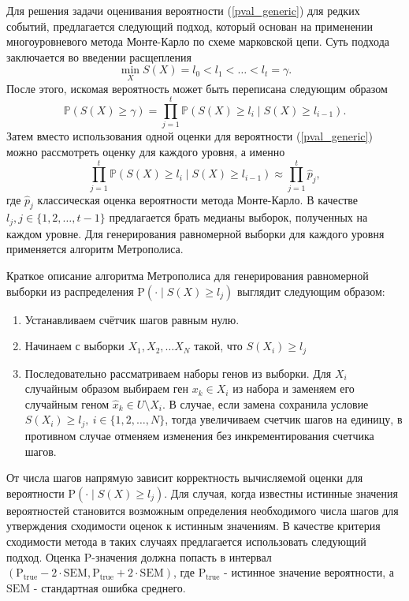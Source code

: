 Для решения задачи оценивания вероятности (\ref{pval_generic}) для редких событий, предлагается следующий подход, который основан на применении многоуровневого метода Монте-Карло по схеме марковской цепи.
Суть подхода заключается во введении расщепления 
\begin{equation*}
    \min_{X} S(X) = l_0 < l_1 < \ldots < l_t = \gamma.
\end{equation*}
После этого, искомая вероятность может быть переписана следующим образом
\begin{equation*}
    \mathbb{P} \left(S(X) \geqslant \gamma \right) = \prod\limits_{j=1}^{t} \mathbb{P} \left(S(X) \geqslant l_i \mid S(X) \geqslant l_{i - 1} \right).
\end{equation*}
Затем вместо использования одной оценки для вероятности (\ref{pval_generic}) можно рассмотреть оценку для каждого уровня, а именно
\begin{equation*}
    \prod\limits_{j=1}^{t} \mathbb{P} \left(S(X) \geqslant l_i \mid S(X) \geqslant l_{i - 1} \right) \approx \prod_{j = 1}^{t} \hat{p}_j,
\end{equation*}
где $\hat{p}_j$ классическая оценка вероятности метода Монте-Карло. 
В качестве $l_j, j \in \{1, 2, \ldots, t-1\}$ предлагается брать медианы выборок, полученных на каждом уровне.
Для генерирования равномерной выборки для каждого уровня применяется алгоритм Метрополиса.

Краткое описание алгоритма Метрополиса для генерирования равномерной выборки из распределения $\mathrm{P}\left(\cdot \mid S(X) \geqslant l_j \right)$ выглядит следующим образом:
\begin{enumerate}
    \item Устанавливаем счётчик шагов равным нулю.
    \item Начинаем с выборки $X_1, X_2, \ldots X_N$ такой, что $S(X_i) \geqslant l_j$
    \item Последовательно рассматриваем наборы генов из выборки. Для $X_i$ случайным образом выбираем ген $x_k \in X_i$ из набора и заменяем его случайным геном $\hat{x}_k \in U \setminus X_i$. В случае, если замена сохранила условие $S(X_i) \geqslant l_j, \ i \in \{1, 2, \ldots, N \}$, тогда увеличиваем счетчик шагов на единицу, в противном случае отменяем изменения без инкрементирования счетчика шагов.
\end{enumerate}
От числа шагов напрямую зависит корректность вычисляемой оценки для вероятности $\mathrm{P}\left(\cdot \mid S(X) \geqslant l_j \right)$.
Для случая, когда известны истинные значения вероятностей становится возможным определения необходимого числа шагов для утверждения сходимости оценок к истинным значениям.
В качестве критерия сходимости метода в таких случаях предлагается использовать следующий подход. Оценка P-значения должна попасть в интервал $\left(\mathrm{P}_{\text{true}} - 2 \cdot \mathrm{SEM}, \mathrm{P}_{\text{true}} + 2 \cdot \mathrm{SEM}\right)$, где $\mathrm{P}_{\text{true}}$ - истинное значение вероятности, а $\mathrm{SEM}$ - стандартная ошибка среднего.

